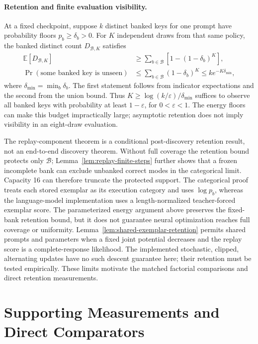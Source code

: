 \paragraph{Retention and finite evaluation visibility.}
At a fixed checkpoint, suppose $k$ distinct banked keys for one prompt have
probability floors $p_b\ge\delta_b>0$. For $K$ independent draws from that
same policy, the banked distinct count $D_{\mathcal B,K}$ satisfies
\[
 \begin{aligned}
 \mathbb E[D_{\mathcal B,K}]
 &\ge\sum_{b\in\mathcal B}\left[1-(1-\delta_b)^K\right],\\
 \Pr(\text{some banked key is unseen})
 &\le\sum_{b\in\mathcal B}(1-\delta_b)^K
 \le k e^{-K\delta_{\min}},
 \end{aligned}
\]
where $\delta_{\min}=\min_b\delta_b$. The first statement follows from
indicator expectations and the second from the union bound. Thus
$K\ge\log(k/\varepsilon)/\delta_{\min}$ suffices to observe all banked keys
with probability at least $1-\varepsilon$, for $0<\varepsilon<1$.
The energy floors can make this budget impractically large; asymptotic
retention does not imply visibility in an eight-draw evaluation.

\begin{remark}
The replay-component theorem is a conditional post-discovery retention result, not an end-to-end
discovery theorem. Without full coverage the retention bound protects only
$\mathcal B$; Lemma~\ref{lem:replay-finite-steps} further shows that a frozen
incomplete bank can exclude unbanked correct modes in the categorical limit.
Capacity 16 can therefore truncate the protected support. The categorical proof treats each stored exemplar as its execution
category and uses $\log p_b$, whereas the language-model implementation uses a
length-normalized teacher-forced exemplar score. The parameterized energy
argument above preserves the fixed-bank retention bound, but it does not
guarantee neural optimization reaches full coverage or uniformity. Lemma~\ref{lem:shared-exemplar-retention} permits shared prompts and
parameters when a fixed joint potential decreases and the replay score is a
complete-response likelihood. The implemented stochastic, clipped, alternating
updates have no such descent guarantee here; their retention must be tested
empirically. These limits motivate the matched factorial comparisons and direct retention measurements.
\end{remark}

\section{Supporting Measurements and Direct Comparators}
\label{app:supporting}

